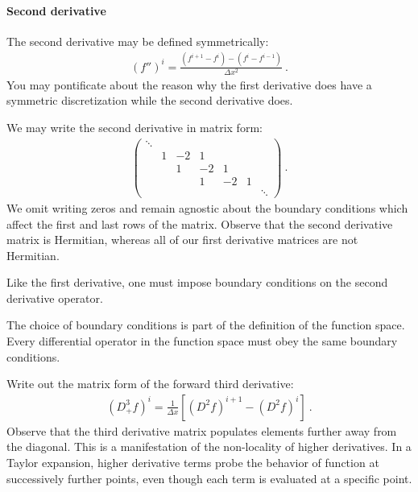 \paragraph{Second derivative}
The second derivative may be defined symmetrically:
\begin{align}
  (f'')^i = \frac{(f^{i+1} - f^i) - (f^i - f^{i-1})}{\Delta x^2} \ .
\end{align}
You may pontificate about the reason why the first derivative does have a symmetric discretization while the second derivative does. 
\begin{example}
We may write the second derivative in matrix form:
\begin{align}
    \begin{pmatrix}
        \ddots & & & & 
        \\
        & 1 & -2 & 1 &  & 
        \\
        &  & 1 & -2 & 1 &  \\
        &  &  & 1 & -2 & 1 \\
        & & & & &  &\ddots
    \end{pmatrix} \ .
    \label{eq:second:derivative:matrix}
\end{align}
We omit writing zeros and remain agnostic about the boundary conditions which affect the first and last rows of the matrix. Observe that the second derivative matrix is Hermitian, whereas all of our first derivative matrices are not Hermitian.
\end{example}
Like the first derivative, one must impose boundary conditions on the second derivative operator. 

\begin{bigidea}
The choice of boundary conditions is part of the definition of the function space. Every differential operator in the function space must obey the same boundary conditions. 
\end{bigidea}

\begin{exercise}
Write out the matrix form of the forward third derivative:
\begin{align}
    \left(D_+^3 f\right)^i = \frac{1}{\Delta x}\left[(D^2 f)^{i+1}-(D^2f)^i\right] \ .
\end{align}
Observe that the third derivative matrix populates elements further away from the diagonal. This is a manifestation of the non-locality of higher derivatives. In a Taylor expansion, higher derivative terms probe the behavior of function at successively further points, even though each term is evaluated at a specific point.
\end{exercise}

